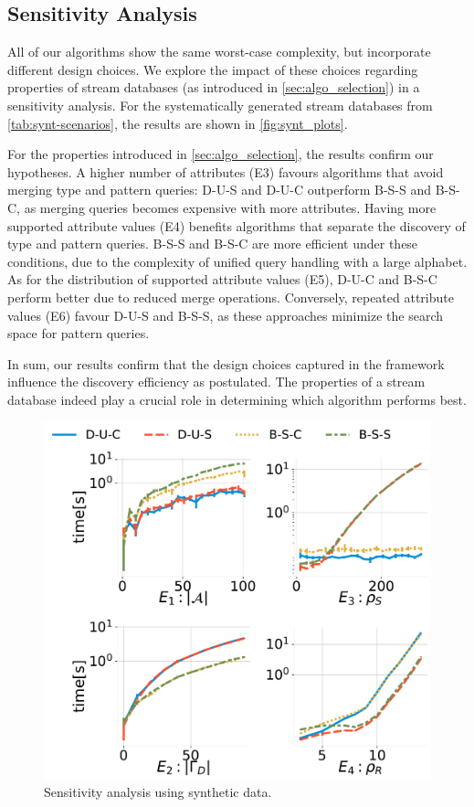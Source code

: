 \subsection{Sensitivity Analysis}
\label{sec:exp_sensitity}


All of our algorithms show the same worst-case complexity, but incorporate
different design choices. We explore the impact of these choices regarding
properties of stream databases (as introduced in
\autoref{sec:algo_selection}) in a sensitivity analysis.
For the systematically generated stream databases from
\autoref{tab:synt-scenarios}, the results are shown in \autoref{fig:synt_plots}.



For the properties introduced in \autoref{sec:algo_selection}, the results
confirm our hypotheses.
A higher number of attributes (E3) favours algorithms that avoid
merging type and pattern queries: D-U-S and D-U-C outperform B-S-S and
B-S-C, as merging queries becomes expensive with more attributes. Having
more supported attribute values (E4) benefits algorithms that separate the
discovery of type and pattern queries.
B-S-S and B-S-C are more efficient under these conditions, due to the
complexity of unified query handling with a large alphabet.
As for the distribution of supported attribute values (E5), D-U-C and B-S-C
perform better due to reduced merge operations.
Conversely, repeated attribute values (E6) favour D-U-S and B-S-S,
as these approaches minimize the search space for pattern queries.

In sum, our results confirm that the design
choices captured in the \sys{} framework influence the discovery efficiency
as postulated.
The properties of a stream database indeed play a crucial role in
determining which algorithm performs best.

\begin{figure}[t]
	\centering
	\includegraphics[width=0.75\columnwidth]{img/synt_plots.pdf}
	\vspace{-1em}
	\caption{Sensitivity analysis using synthetic data.}
	\label{fig:synt_plots}
	\vspace{-1.5em}
\end{figure}

